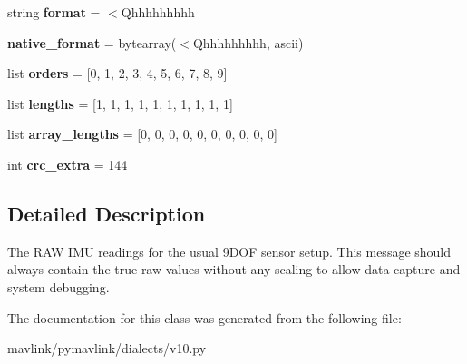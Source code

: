 \begin{DoxyCompactItemize}
string {\bfseries format} = \textquotesingle{}$<$Qhhhhhhhhh\textquotesingle{}
\item 
\mbox{\label{classpymavlink_1_1dialects_1_1v10_1_1MAVLink__raw__imu__message_a0ba30cdfa94f2d0dc453c2a7c2790e93}} 
{\bfseries native\+\_\+format} = bytearray(\textquotesingle{}$<$Qhhhhhhhhh\textquotesingle{}, \textquotesingle{}ascii\textquotesingle{})
\item 
\mbox{\label{classpymavlink_1_1dialects_1_1v10_1_1MAVLink__raw__imu__message_ab16936e65d8f64b78d8f516950f7463c}} 
list {\bfseries orders} = \mbox{[}0, 1, 2, 3, 4, 5, 6, 7, 8, 9\mbox{]}
\item 
\mbox{\label{classpymavlink_1_1dialects_1_1v10_1_1MAVLink__raw__imu__message_a9b1364f1fd354f5b96670624da2593ba}} 
list {\bfseries lengths} = \mbox{[}1, 1, 1, 1, 1, 1, 1, 1, 1, 1\mbox{]}
\item 
\mbox{\label{classpymavlink_1_1dialects_1_1v10_1_1MAVLink__raw__imu__message_a7784b2e4cb7f6d2e73e65483e99c927e}} 
list {\bfseries array\+\_\+lengths} = \mbox{[}0, 0, 0, 0, 0, 0, 0, 0, 0, 0\mbox{]}
\item 
\mbox{\label{classpymavlink_1_1dialects_1_1v10_1_1MAVLink__raw__imu__message_a26d605d5f7ea87fedcd98d85d8bb7095}} 
int {\bfseries crc\+\_\+extra} = 144
\end{DoxyCompactItemize}


\subsection{Detailed Description}
\begin{DoxyVerb}The RAW IMU readings for the usual 9DOF sensor setup. This
message should always contain the true raw values without any
scaling to allow data capture and system debugging.
\end{DoxyVerb}
 

The documentation for this class was generated from the following file\+:\begin{DoxyCompactItemize}
\item 
mavlink/pymavlink/dialects/v10.\+py\end{DoxyCompactItemize}
